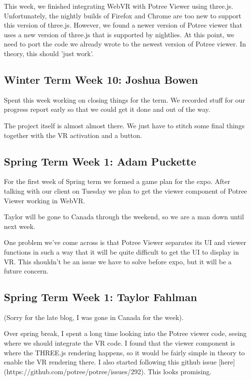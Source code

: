\documentclass[draftclsnofoot,onecolumn]{IEEEtran}
\begin{document}
This week, we finished integrating WebVR with Potree Viewer using three.js. Unfortunately, the nightly builds of Firefox and Chrome are too new to support this version of three.js. However, we found a newer version of Potree viewer that uses a new version of three.js that is supported by nightlies. At this point, we need to port the code we already wrote to the newest version of Potree viewer. In theory, this should 'just work'.

\subsection{Winter Term Week 10: Joshua Bowen}

Spent this week working on closing things for the term. We recorded stuff for our progress report early so that we could get it done and out of the way.

The project itself is almost almost there. We just have to stitch some final things together with the VR activation and a button.

\subsection{Spring Term Week 1: Adam Puckette}

For the first week of Spring term we formed a game plan for the expo. After talking with our client on Tuesday we plan to get the viewer component of Potree Viewer working in WebVR.

Taylor will be gone to Canada through the weekend, so we are a man down until next week.

One problem we've come across is that Potree Viewer separates its UI and viewer functions in such a way that it will be quite difficult to get the UI to display in VR. This shouldn't be an issue we have to solve before expo, but it will be a future concern.

\subsection{Spring Term Week 1: Taylor Fahlman}

(Sorry for the late blog, I was gone in Canada for the week).

Over spring break, I spent a long time looking into the Potree viewer code, seeing where we should integrate the VR code. I found that the viewer component is where the THREE.js rendering happens, so it would be fairly simple in theory to enable the VR rendering there. I also started following this github issue [here](https://github.com/potree/potree/issues/292). This looks promising.
\end{document}
